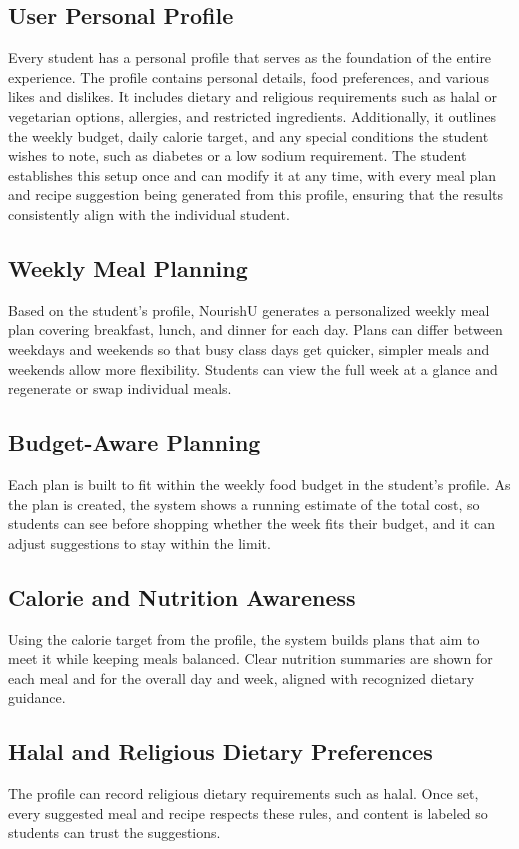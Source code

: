\documentclass[11pt,a4paper]{article}
\begin{document}
\subsection{User Personal Profile}
Every student has a personal profile that serves as the foundation of the entire experience. The profile contains personal details, food preferences, and various likes and dislikes. It includes dietary and religious requirements such as halal or vegetarian options, allergies, and restricted ingredients. Additionally, it outlines the weekly budget, daily calorie target, and any special conditions the student wishes to note, such as diabetes or a low sodium requirement. The student establishes this setup once and can modify it at any time, with every meal plan and recipe suggestion being generated from this profile, ensuring that the results consistently align with the individual student.

\subsection{Weekly Meal Planning}
Based on the student's profile, NourishU generates a personalized weekly meal plan covering breakfast, lunch, and dinner for each day. Plans can differ between weekdays and weekends so that busy class days get quicker, simpler meals and weekends allow more flexibility. Students can view the full week at a glance and regenerate or swap individual meals.

\subsection{Budget-Aware Planning}
Each plan is built to fit within the weekly food budget in the student's profile. As the plan is created, the system shows a running estimate of the total cost, so students can see before shopping whether the week fits their budget, and it can adjust suggestions to stay within the limit.

\subsection{Calorie and Nutrition Awareness}
Using the calorie target from the profile, the system builds plans that aim to meet it while keeping meals balanced. Clear nutrition summaries are shown for each meal and for the overall day and week, aligned with recognized dietary guidance.

\subsection{Halal and Religious Dietary Preferences}
The profile can record religious dietary requirements such as halal. Once set, every suggested meal and recipe respects these rules, and content is labeled so students can trust the suggestions.
\end{document}
